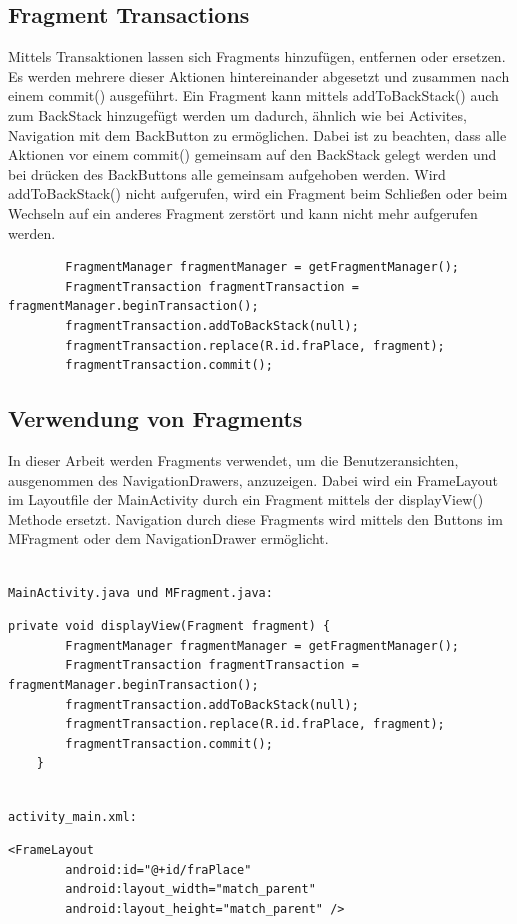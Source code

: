 \documentclass[FIPLY_base.tex]{subfiles}
\begin{document}
\subsection{Fragment Transactions}
Mittels Transaktionen lassen sich Fragments hinzufügen, entfernen oder ersetzen.
Es werden mehrere dieser Aktionen hintereinander abgesetzt und zusammen nach einem commit() ausgeführt.
Ein Fragment kann mittels addToBackStack() auch zum BackStack hinzugefügt werden um dadurch, ähnlich wie bei Activites, Navigation mit dem BackButton zu ermöglichen.
Dabei ist zu beachten, dass alle Aktionen vor einem commit() gemeinsam auf den BackStack gelegt werden und bei drücken des BackButtons alle gemeinsam aufgehoben werden.
Wird addToBackStack() nicht aufgerufen, wird ein Fragment beim Schließen oder beim Wechseln auf ein anderes Fragment zerstört und kann nicht mehr aufgerufen werden.

\begin{lstlisting}
        FragmentManager fragmentManager = getFragmentManager();
        FragmentTransaction fragmentTransaction = fragmentManager.beginTransaction();
        fragmentTransaction.addToBackStack(null);
        fragmentTransaction.replace(R.id.fraPlace, fragment);
        fragmentTransaction.commit();
\end{lstlisting}

\newpage
\subsection{Verwendung von Fragments}
In dieser Arbeit werden Fragments verwendet, um die Benutzeransichten, ausgenommen des NavigationDrawers, anzuzeigen.
Dabei wird ein FrameLayout im Layoutfile der MainActivity durch ein Fragment mittels der displayView() Methode ersetzt.
Navigation durch diese Fragments wird mittels den Buttons im MFragment oder dem NavigationDrawer ermöglicht.

\ \\
\texttt{MainActivity.java und MFragment.java:}
\begin{lstlisting}
private void displayView(Fragment fragment) {
        FragmentManager fragmentManager = getFragmentManager();
        FragmentTransaction fragmentTransaction = fragmentManager.beginTransaction();
        fragmentTransaction.addToBackStack(null);
        fragmentTransaction.replace(R.id.fraPlace, fragment);
        fragmentTransaction.commit();
    }
\end{lstlisting}

\ \\
\texttt{activity\_main.xml:}
\begin{lstlisting}
<FrameLayout
        android:id="@+id/fraPlace"
        android:layout_width="match_parent"
        android:layout_height="match_parent" />
\end{lstlisting}
\end{document}
